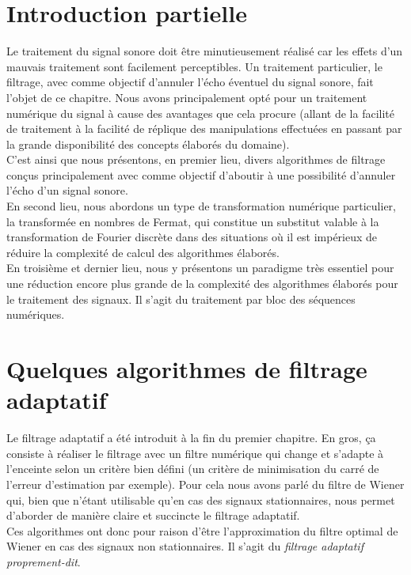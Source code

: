 \section{Introduction partielle}
Le traitement du signal sonore doit être minutieusement réalisé car les effets d'un mauvais traitement sont facilement perceptibles. Un traitement particulier, le filtrage, avec comme objectif d'annuler l'écho éventuel du signal sonore, fait l'objet de ce chapitre. Nous avons principalement opté pour un traitement numérique du signal à cause des avantages que cela procure (allant de la facilité de traitement à la facilité de réplique des manipulations effectuées en passant par la grande disponibilité des concepts élaborés du domaine).\\
C'est ainsi que nous présentons, en premier lieu, divers algorithmes de filtrage conçus principalement avec comme objectif d'aboutir à une possibilité d'annuler l'écho d'un signal sonore.\\
En second lieu, nous abordons un type de transformation numérique particulier, la transformée en nombres de Fermat, qui constitue un substitut valable à la transformation de Fourier discrète dans des situations où il est impérieux de réduire la complexité de calcul des algorithmes élaborés.\\
En troisième et dernier lieu, nous y présentons un paradigme très essentiel pour une réduction encore plus grande de la complexité des algorithmes élaborés pour le traitement des signaux. Il s'agit du traitement par bloc des séquences numériques.\\
\section{Quelques algorithmes de filtrage adaptatif}
Le filtrage adaptatif a été introduit à la fin du premier chapitre. En gros, ça consiste à réaliser le filtrage avec un filtre numérique qui change et s'adapte à l'enceinte selon un critère bien défini (un critère de minimisation du carré de l'erreur d'estimation par exemple). Pour cela nous avons parlé du filtre de Wiener qui, bien que n'étant utilisable qu'en cas des signaux stationnaires, nous permet d'aborder de manière claire et succincte le filtrage adaptatif.\\
Ces algorithmes ont donc pour raison d'être l'approximation du filtre optimal de Wiener en cas des signaux non stationnaires. Il s'agit du \emph{filtrage adaptatif proprement-dit}.
